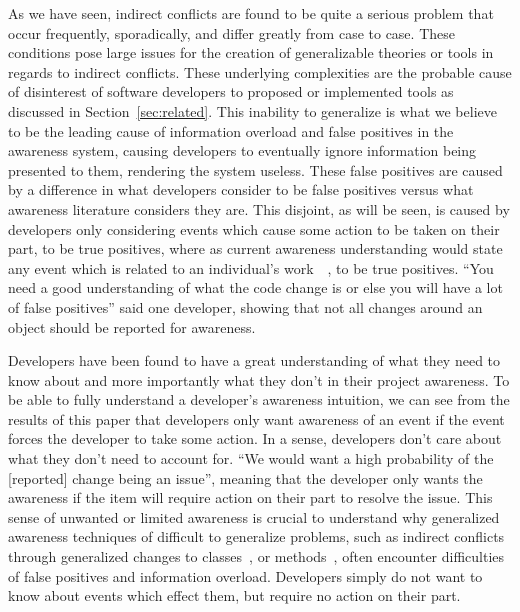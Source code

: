\documentclass[conference]{IEEEtran}
\begin{document}
As we have seen, indirect conflicts are found to be quite a serious problem that occur frequently,
sporadically, and differ greatly from case to case. These conditions pose large issues for the creation of generalizable theories
or tools in regards to indirect conflicts. These underlying complexities are the probable cause of disinterest of software developers
to proposed or implemented tools as discussed in Section~\ref{sec:related}. This inability to generalize is what we believe to be the
leading cause of information overload and false positives in the awareness system, causing developers to eventually ignore 
information being presented to them, rendering the system useless. These false positives are caused by a difference in what
developers consider to be false positives versus what awareness literature considers they are. This disjoint, as will
be seen, is caused by developers only considering events which cause some action to be taken on their part, to be true positives,
where as current awareness understanding would state any event which is related to an individual's 
work~\cite{Herbsleb06collaborationin}~\cite{Cataldo:2008:SCF}, to be true positives.
``You need a good understanding of what the code change is or else you will have a lot of false positives'' said one developer,
showing that not all changes around an object should be reported for awareness.

Developers have been found to have a great understanding of what they need to know about and more importantly what they don't in
their project awareness. To be able to fully understand a developer's awareness intuition, we can see from the results of this paper that
developers only want awareness of an event if the event forces the developer to take some action. In a sense, developers
don't care about what they don't need to account for. ``We would want a high probability of the [reported] change being an issue'', meaning
that the developer only wants the awareness if the item will require action on their part to resolve the issue.
This sense of unwanted or limited awareness is crucial to understand why generalized
awareness techniques of difficult to generalize problems, such as indirect conflicts through generalized changes to 
classes~\cite{Sarma:2007:TSA}, or methods~\cite{Trainer:2005:BGT,Servant:2010:CPI}, often encounter difficulties of false
positives and information overload. 
Developers simply do not want to know about events which effect them, but require no action on their part. 
\end{document}
